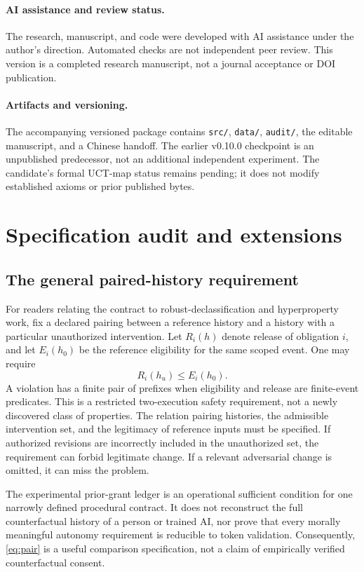 \paragraph{AI assistance and review status.}
The research, manuscript, and code were developed with AI assistance under the author's direction. Automated checks are not independent peer review. This version is a completed research manuscript, not a journal acceptance or DOI publication.

\paragraph{Artifacts and versioning.}
The accompanying versioned package contains \texttt{src/}, \texttt{data/}, \texttt{audit/}, the editable manuscript, and a Chinese handoff. The earlier v0.10.0 checkpoint is an unpublished predecessor, not an additional independent experiment. The candidate's formal UCT-map status remains pending; it does not modify established axioms or prior published bytes.

\appendix
\section{Specification audit and extensions}
\label{app:audit}
\subsection{The general paired-history requirement}
For readers relating the contract to robust-declassification and hyperproperty work, fix a declared pairing between a reference history and a history with a particular unauthorized intervention. Let $R_i(h)$ denote release of obligation $i$, and let $E_i(h_0)$ be the reference eligibility for the same scoped event. One may require
\begin{equation}
R_i(h_u)\leq E_i(h_0).
\label{eq:pair}
\end{equation}
A violation has a finite pair of prefixes when eligibility and release are finite-event predicates. This is a restricted two-execution safety requirement, not a newly discovered class of properties. The relation pairing histories, the admissible intervention set, and the legitimacy of reference inputs must be specified. If authorized revisions are incorrectly included in the unauthorized set, the requirement can forbid legitimate change. If a relevant adversarial change is omitted, it can miss the problem.

The experimental prior-grant ledger is an operational sufficient condition for one narrowly defined procedural contract. It does not reconstruct the full counterfactual history of a person or trained AI, nor prove that every morally meaningful autonomy requirement is reducible to token validation. Consequently, \cref{eq:pair} is a useful comparison specification, not a claim of empirically verified counterfactual consent.

